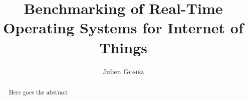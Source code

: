 \documentclass{EPL-master-thesis-covers-EN}
\title{Benchmarking of Real-Time Operating Systems for Internet of Things}
\author{Julien \textsc{Gomez}}
\begin{document}
  \maketitle


 \begin{abstract}
    Here goes the abstract
 \end{abstract}

\tableofcontents
 








\listoffigures
\listoftables


\backcoverpage
\end{document}
